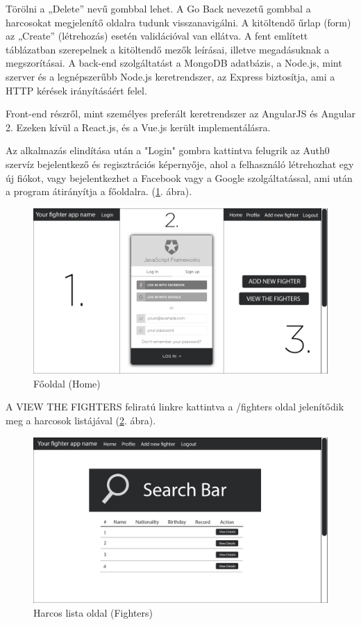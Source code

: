 Törölni a „Delete” nevű gombbal lehet. A Go Back nevezetű gombbal a harcosokat megjelenítő oldalra tudunk visszanavigálni. A kitöltendő űrlap (form) az „Create” (létrehozás) esetén validációval van ellátva. A fent említett táblázatban szerepelnek a kitöltendő mezők leírásai, illetve megadásuknak a megszorításai. A back-end szolgáltatást a MongoDB adatbázis, a Node.js, mint szerver és a legnépszerűbb Node.js keretrendszer, az Express biztosítja, ami a HTTP kérések irányításáért felel.

Front-end részről, mint személyes preferált keretrendszer az AngularJS és Angular 2. Ezeken kívül a React.js, és a Vue.js került implementálásra.

Az alkalmazás elindítása után a "Login" gombra kattintva felugrik az Auth0 szervíz bejelentkező és regisztrációs képernyője, ahol a felhasználó létrehozhat egy új fiókot, vagy bejelentkezhet a Facebook vagy a Google szolgáltatással, ami után a program átirányítja a főoldalra. (\ref{fig:home}. ábra).

\begin{figure}[htb]
\centering
\includegraphics[scale=0.7]{kepek/login_auth0_home.jpg}
\caption{Főoldal (Home)}
\label{fig:home}
\end{figure}

A VIEW THE FIGHTERS feliratú linkre kattintva a /fighters oldal jelenítődik meg a harcosok listájával (\ref{fig:search_bar}. ábra).

\begin{figure}[htb]
\centering
\includegraphics[scale=0.7]{kepek/search_bar.jpg}
\caption{Harcos lista oldal (Fighters)}
\label{fig:search_bar}
\end{figure}

